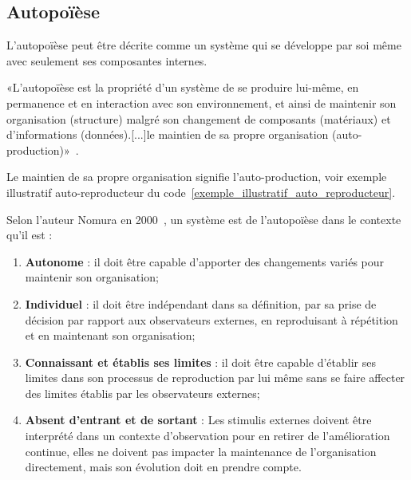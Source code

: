 

\subsection{Autopoïèse}

L'autopoïèse peut être décrite comme un système qui se développe par soi même avec seulement ses composantes internes.

«L'autopoïèse est la propriété d'un système de se produire lui-même, en permanence et en interaction avec son environnement, et ainsi de maintenir son organisation (structure) malgré son changement de composants (matériaux) et d'informations (données).[...]le maintien de sa propre organisation (auto-production)»~\cite{wiki_autopoiesis_2022}.

Le maintien de sa propre organisation signifie l'auto-production, voir exemple illustratif auto-reproducteur du code~\ref{exemple_illustratif_auto_reproducteur}.

Selon l'auteur Nomura en 2000~\cite{tatsuya_computational_autopoiesis_2000}, un système est de l'autopoïèse dans le contexte qu'il est : 
\begin{enumerate}
    \item \textbf{Autonome} : il doit être capable d'apporter des changements variés pour maintenir son organisation;
    \item \textbf{Individuel} : il doit être indépendant dans sa définition, par sa prise de décision par rapport aux observateurs externes, en reproduisant à répétition et en maintenant son organisation;
    \item \textbf{Connaissant et établis ses limites} : il doit être capable d'établir ses limites dans son processus de reproduction par lui même sans se faire affecter des limites établis par les observateurs externes;
    \item \textbf{Absent d'entrant et de sortant} : Les stimulis externes doivent être interprété dans un contexte d'observation pour en retirer de l'amélioration continue, elles ne doivent pas impacter la maintenance de l'organisation directement, mais son évolution doit en prendre compte.
\end{enumerate}

